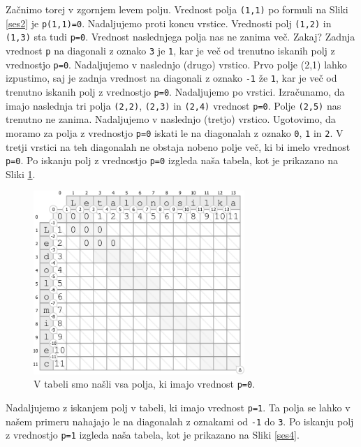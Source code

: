 \documentclass[a4paper, 12pt, twoside]{book}
\begin{document}
Začnimo torej v zgornjem levem polju. Vrednost polja {\tt (1,1)} po formuli na Sliki \ref{ses2} je {\tt p(1,1)=0}. Nadaljujemo proti koncu vrstice. Vrednosti polj {\tt (1,2)} in {\tt (1,3)} sta tudi {\tt p=0}. Vrednost naslednjega polja nas ne zanima več. Zakaj? Zadnja vrednost {\tt p} na diagonali z oznako {\tt 3} je {\tt 1}, kar je več od trenutno iskanih polj z vrednostjo {\tt p=0}. Nadaljujemo v naslednjo (drugo) vrstico. Prvo polje (2,1) lahko izpustimo, saj je zadnja vrednost na diagonali z oznako {\tt -1} že {\tt 1}, kar je več od trenutno iskanih polj z vrednostjo {\tt p=0}. Nadaljujemo po vrstici. Izračunamo, da imajo naslednja tri polja {\tt (2,2)}, {\tt (2,3)} in {\tt (2,4)} vrednost {\tt p=0}. Polje {\tt (2,5)} nas trenutno ne zanima. Nadaljujemo v naslednjo (tretjo) vrstico. Ugotovimo, da moramo za polja z vrednostjo {\tt p=0} iskati le na diagonalah z oznako {\tt 0}, {\tt 1} in {\tt 2}. V tretji vrstici na teh diagonalah ne obstaja nobeno polje več, ki bi imelo vrednost {\tt p=0}. Po iskanju polj z vrednostjo {\tt p=0} izgleda naša tabela, kot je prikazano na Sliki \ref{ses3}.

\begin{figure}[placement h]
\begin{center}
\includegraphics[width=8cm]{img/ses3.pdf}
\end{center}
\caption{V tabeli smo našli vsa polja, ki imajo vrednost {\tt p=0}.}
\label{ses3}
\end{figure}

\pagebreak

Nadaljujemo z iskanjem polj v tabeli, ki imajo vrednost {\tt p=1}. Ta polja se lahko v našem primeru nahajajo le na diagonalah z oznakami od {\tt -1} do {\tt 3}. Po iskanju polj z vrednostjo {\tt p=1} izgleda naša tabela, kot je prikazano na Sliki \ref{ses4}.
\end{document}
